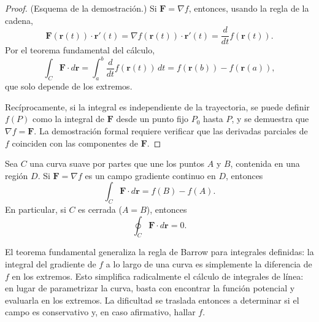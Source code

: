 \begin{proof}
(Esquema de la demostración.) Si $\mathbf{F}=\nabla f$, entonces,
usando la regla de la cadena,
\[
\mathbf{F}(\mathbf{r}(t)) \cdot \mathbf{r}'(t)
= \nabla f(\mathbf{r}(t)) \cdot \mathbf{r}'(t)
= \frac{d}{dt} f(\mathbf{r}(t)).
\]
Por el teorema fundamental del cálculo,
\[
\int_C \mathbf{F} \cdot d\mathbf{r}
= \int_a^b \frac{d}{dt} f(\mathbf{r}(t)) \, dt
= f(\mathbf{r}(b)) - f(\mathbf{r}(a)),
\]
que solo depende de los extremos.

Recíprocamente, si la integral es independiente de la trayectoria, se
puede definir $f(P)$ como la integral de $\mathbf{F}$ desde un punto
fijo $P_0$ hasta $P$, y se demuestra que $\nabla f = \mathbf{F}$.
La demostración formal requiere verificar que las derivadas parciales
de $f$ coinciden con las componentes de $\mathbf{F}$.
\end{proof}

\begin{theorem}
Sea $C$ una curva suave por partes que une los puntos $A$ y $B$,
contenida en una región $D$. Si $\mathbf{F} = \nabla f$ es un campo
gradiente continuo en $D$, entonces
\[
\int_C \mathbf{F} \cdot d\mathbf{r} = f(B) - f(A).
\]
En particular, si $C$ es cerrada ($A=B$), entonces
\[
\oint_C \mathbf{F} \cdot d\mathbf{r} = 0.
\]
\end{theorem}

\begin{rem}
El teorema fundamental generaliza la regla de Barrow para integrales
definidas: la integral del gradiente de $f$ a lo largo de una curva
es simplemente la diferencia de $f$ en los extremos. Esto simplifica
radicalmente el cálculo de integrales de línea: en lugar de parametrizar
la curva, basta con encontrar la función potencial y evaluarla en los
extremos. La dificultad se traslada entonces a determinar si el campo
es conservativo y, en caso afirmativo, hallar $f$.
\end{rem}

